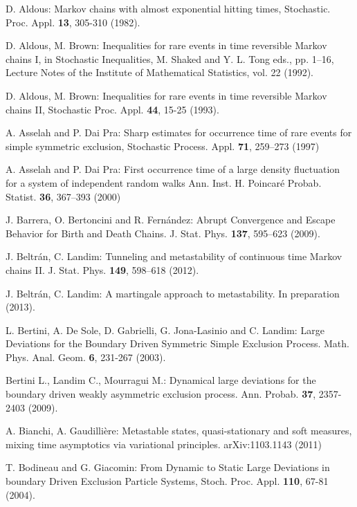 \documentclass[reqno]{amsart}
\begin{document}
\begin{thebibliography}{99}

 D. Aldous: Markov chains with almost exponential hitting
  times, Stochastic. Proc. Appl. {\bf 13}, 305-310 (1982).

 D. Aldous, M. Brown: Inequalities for rare events in time
  reversible Markov chains I, in Stochastic Inequalities, M. Shaked
  and Y. L. Tong eds., pp. 1--16, Lecture Notes of the Institute of
  Mathematical Statistics, vol. 22 (1992).

 D. Aldous, M. Brown: Inequalities for rare events in time
  reversible Markov chains II, Stochastic Proc. Appl. {\bf 44}, 15-25
  (1993).

 A. Asselah and P. Dai Pra: Sharp estimates for
  occurrence time of rare events for simple symmetric exclusion,
  Stochastic Process. Appl. {\bf 71},  259--273 (1997)

 A. Asselah and P. Dai Pra: First occurrence time of a
  large density fluctuation for a system of independent random walks
  Ann. Inst. H. Poincar\'e Probab. Statist. {\bf 36}, 367--393 (2000)

 J. Barrera, O. Bertoncini and R. Fern\'andez: Abrupt
  Convergence and Escape Behavior for Birth and Death
  Chains. J. Stat. Phys. {\bf 137}, 595--623 (2009).

 J. Beltr\'an, C. Landim: Tunneling and metastability of
  continuous time Markov chains II. J. Stat. Phys. {\bf 149}, 598--618
  (2012).

 J. Beltr\'an, C. Landim: A martingale approach to
  metastability.  In preparation (2013).

 L. Bertini, A. De Sole, D. Gabrielli, G. Jona-Lasinio
  and C. Landim: Large Deviations for the Boundary Driven Symmetric
  Simple Exclusion Process. Math. Phys.  Anal. Geom. {\bf 6}, 231-267
  (2003).
 
 Bertini L., Landim C., Mourragui M.: Dynamical large
  deviations for the boundary driven weakly asymmetric exclusion
  process. Ann. Probab. {\bf 37}, 2357-2403 (2009).

 A. Bianchi, A. Gaudilli\`ere: Metastable states,
  quasi-stationary and soft measures, mixing time asymptotics via
  variational principles. arXiv:1103.1143 (2011)

 T. Bodineau and G. Giacomin: From Dynamic to Static
  Large Deviations in boundary Driven Exclusion Particle Systems,
  Stoch. Proc. Appl. {\bf 110}, 67-81 (2004).


\end{thebibliography}
\end{document}
